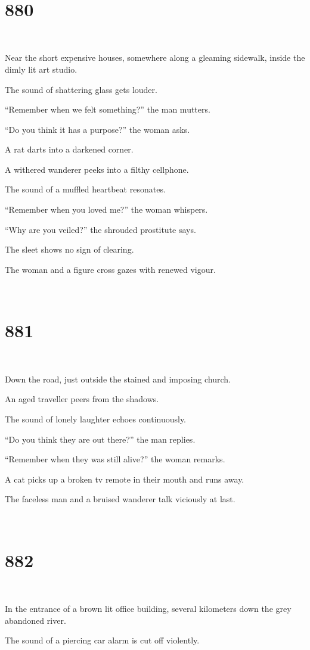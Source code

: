\documentclass{report}
\begin{document}
~
\chapter*{880}
~

Near the short expensive houses, somewhere along a gleaming sidewalk, inside the dimly lit art studio.

The sound of shattering glass gets louder.

``Remember when we felt something?'' the man mutters.

``Do you think it has a purpose?'' the woman asks.

A rat darts into a darkened corner.

A withered wanderer peeks into a filthy cellphone.

The sound of a muffled heartbeat resonates.

``Remember when you loved me?'' the woman whispers.

``Why are you veiled?'' the shrouded prostitute says.

The sleet shows no sign of clearing.

The woman and a figure cross gazes with renewed vigour.

~
\chapter*{881}
~

Down the road, just outside the stained and imposing church.

An aged traveller peers from the shadows.

The sound of lonely laughter echoes continuously.

``Do you think they are out there?'' the man replies.

``Remember when they was still alive?'' the woman remarks.

A cat picks up a broken tv remote in their mouth and runs away.

The faceless man and a bruised wanderer talk viciously at last.

~
\chapter*{882}
~

In the entrance of a brown lit office building, several kilometers down the grey abandoned river.

The sound of a piercing car alarm is cut off violently.
\end{document}
